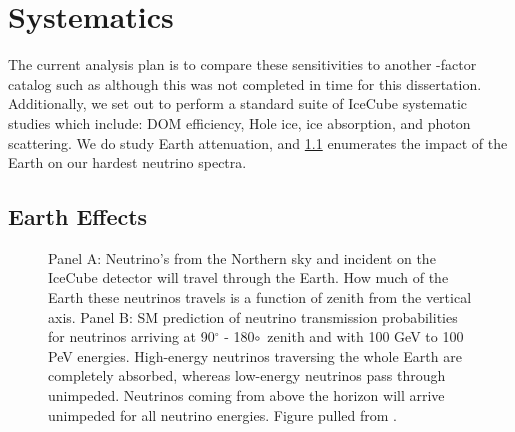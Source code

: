 \section{Systematics} \label{sec:icDM_Systematics}

The current analysis plan is to compare these sensitivities to another \J-factor catalog such as \LS \cite{DM_Strigari20} although this was not completed in time for this dissertation.
Additionally, we set out to perform a standard suite of IceCube systematic studies which include: DOM efficiency, Hole ice, ice absorption, and photon scattering.
We do study Earth attenuation, and \cref{sec:icDM_eart_effects} enumerates the impact of the Earth on our hardest neutrino spectra.

\subsection{Earth Effects} \label{sec:icDM_eart_effects}

\begin{figure}[t]
    \caption{Panel A: Neutrino's from the Northern sky and incident on the IceCube detector will travel through the Earth. How much of the Earth these neutrinos travels is a function of zenith from the vertical axis. Panel B: SM prediction of neutrino transmission probabilities for neutrinos arriving at 90$^\circ$ - 180$\circ$~zenith and with 100 GeV to 100 PeV energies. High-energy neutrinos traversing the whole Earth are completely absorbed, whereas low-energy neutrinos pass through unimpeded. Neutrinos coming from above the horizon will arrive unimpeded for all neutrino energies. Figure pulled from \cite{IC3:Earth_Attenuation}.}
    \label{fig:earth_attenuation}
\end{figure}


